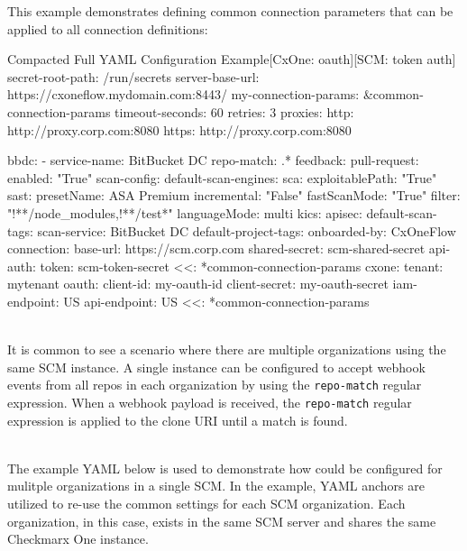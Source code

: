 This example demonstrates defining common connection parameters that can be applied
to all connection definitions:

\begin{code}{Compacted Full YAML Configuration Example}{[CxOne: oauth]}{[SCM: token auth]}
secret-root-path: /run/secrets
server-base-url: https://cxoneflow.mydomain.com:8443/
my-connection-params: &common-connection-params
    timeout-seconds: 60
    retries: 3
    proxies:
        http: http://proxy.corp.com:8080
        https: http://proxy.corp.com:8080


bbdc:
    - service-name: BitBucket DC
      repo-match: .*
      feedback:
        pull-request:
            enabled: "True"
      scan-config:
          default-scan-engines:
              sca:
                  exploitablePath: "True"
              sast:
                  presetName: ASA Premium
                  incremental: "False"
                  fastScanMode: "True"
                  filter: "!**/node_modules,!**/test*"
                  languageMode: multi
              kics:
              apisec:
          default-scan-tags:
              scan-service: BitBucket DC
          default-project-tags:
              onboarded-by: CxOneFlow
      connection:
          base-url: https://scm.corp.com
          shared-secret: scm-shared-secret
          api-auth:
              token: scm-token-secret
          <<: *common-connection-params
      cxone:
          tenant: mytenant
          oauth:
              client-id: my-oauth-id
              client-secret: my-oauth-secret
          iam-endpoint: US
          api-endpoint: US
          <<: *common-connection-params
\end{code}


\noindent\\It is common to see a scenario where there are multiple organizations
using the same SCM instance.  A single \cxoneflow instance can be configured to accept
webhook events from all repos in each organization by using the \texttt{repo-match}
regular expression.  When a webhook payload is received, the \texttt{repo-match}
regular expression is applied to the clone URI until a match is found.

\noindent\\The example YAML below is used to demonstrate how \cxoneflow could be configured
for mulitple organizations in a single SCM. In the example, YAML anchors are utilized to 
re-use the common settings for each SCM organization.  Each organization, in this case, 
exists in the same SCM server and shares the same Checkmarx One instance.

